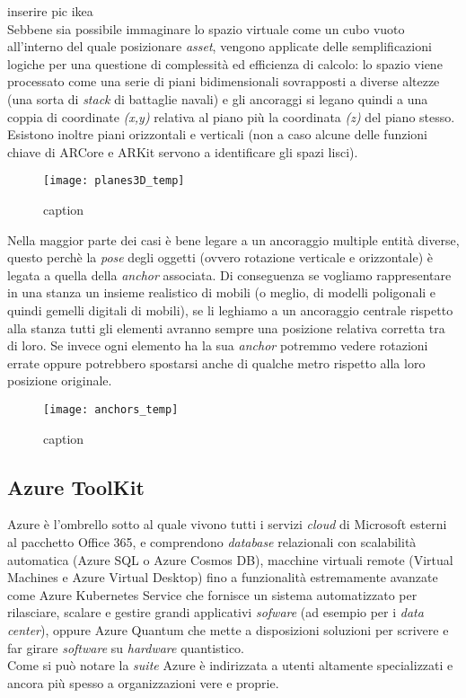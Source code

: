 \todo{} inserire pic ikea\\

Sebbene sia possibile immaginare lo spazio virtuale come un cubo vuoto all'interno del quale posizionare \textit{asset}, vengono applicate delle semplificazioni logiche per una questione di complessità ed efficienza di calcolo: lo spazio viene processato come una serie di piani bidimensionali sovrapposti a diverse altezze (una sorta di \textit{stack} di battaglie navali) e gli ancoraggi si legano quindi a una coppia di coordinate \textit{(x,y)} relativa al piano più la coordinata \textit{(z)} del piano stesso. Esistono inoltre piani orizzontali e verticali (non a caso alcune delle funzioni chiave di ARCore e ARKit servono a identificare gli spazi lisci).

\begin{figure}[H]
  \centering
  \texttt{[image: planes3D\_temp]}
  \caption[Piani in realtà aumentata]{caption \todo}
\end{figure}

Nella maggior parte dei casi è bene legare a un ancoraggio multiple entità diverse, questo perchè la \textit{pose} degli oggetti (ovvero rotazione verticale e orizzontale) è legata a quella della \textit{anchor} associata. Di conseguenza se vogliamo rappresentare in una stanza un insieme realistico di mobili (o meglio, di modelli poligonali e quindi gemelli digitali di mobili), se li leghiamo a un ancoraggio centrale rispetto alla stanza tutti gli elementi avranno sempre una posizione relativa corretta tra di loro. Se invece ogni elemento ha la sua \textit{anchor} potremmo vedere rotazioni errate oppure potrebbero spostarsi anche di qualche metro rispetto alla loro posizione originale.

\begin{figure}[H]
  \centering
  \texttt{[image: anchors\_temp]}
  \caption[Ancoraggi singoli per multipli elementi]{caption \todo}
\end{figure}

\subsection{Azure ToolKit}
Azure è l'ombrello sotto al quale vivono tutti i servizi \textit{cloud} di Microsoft esterni al pacchetto Office 365, e comprendono \textit{database} relazionali con scalabilità automatica (Azure SQL o Azure Cosmos DB), macchine virtuali remote (Virtual Machines e Azure Virtual Desktop) fino a funzionalità estremamente avanzate come Azure Kubernetes Service che fornisce un sistema automatizzato per rilasciare, scalare e gestire grandi applicativi \textit{sofware} (ad esempio per i \textit{data center}), oppure Azure Quantum che mette a disposizioni soluzioni per scrivere e far girare \textit{software} su \textit{hardware} quantistico.\\
Come si può notare la \textit{suite} Azure è indirizzata a utenti altamente specializzati e ancora più spesso a organizzazioni vere e proprie.

